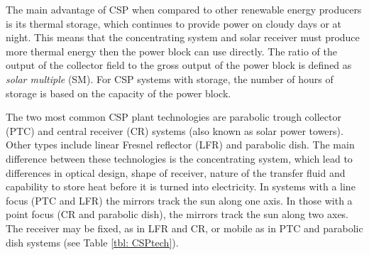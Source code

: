 The main advantage of CSP when compared to other renewable energy producers is its thermal storage, which continues to provide power on cloudy days or at night. This means that the concentrating system and solar receiver must produce more thermal energy then the power block can use directly. The ratio of the output of the collector field to the gross output of the power block is defined as \emph{solar multiple} (SM). For CSP systems with storage, the number of hours of storage is based on the capacity of the power block.

The two most common CSP plant technologies are parabolic trough collector (PTC) and central receiver (CR) systems (also known as solar power towers). Other types include linear Fresnel reflector (LFR) and parabolic dish. The main difference between these technologies is the concentrating system, which lead to differences in optical design, shape of receiver, nature of the transfer fluid and capability to store heat before it is turned into electricity. In systems with a line focus (PTC and LFR) the mirrors track the sun along one axis. In those with a point focus (CR and parabolic dish), the mirrors track the sun along two axes. The receiver may be fixed, as in LFR and CR, or mobile as in PTC and parabolic dish systems (see Table \ref{tbl: CSPtech}).

